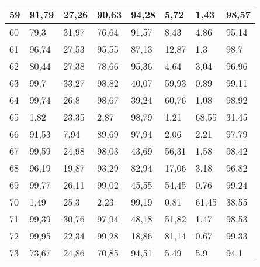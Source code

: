\begin{longtable}[c]{|l|l|l|l|l|l|l|l|}
59              & 91,79        & 27,26        & 90,63       & 94,28         & 5,72          & 1,43          & 98,57         \\ \hline
60              & 79,3         & 31,97        & 76,64       & 91,57         & 8,43          & 4,86          & 95,14         \\ \hline
61              & 96,74        & 27,53        & 95,55       & 87,13         & 12,87         & 1,3           & 98,7          \\ \hline
62              & 80,44        & 27,38        & 78,66       & 95,36         & 4,64          & 3,04          & 96,96         \\ \hline
63              & 99,7         & 33,27        & 98,82       & 40,07         & 59,93         & 0,89          & 99,11         \\ \hline
64              & 99,74        & 26,8         & 98,67       & 39,24         & 60,76         & 1,08          & 98,92         \\ \hline
65              & 1,82         & 23,35        & 2,87        & 98,79         & 1,21          & 68,55         & 31,45         \\ \hline
66              & 91,53        & 7,94         & 89,69       & 97,94         & 2,06          & 2,21          & 97,79         \\ \hline
67              & 99,59        & 24,98        & 98,03       & 43,69         & 56,31         & 1,58          & 98,42         \\ \hline
68              & 96,19        & 19,87        & 93,29       & 82,94         & 17,06         & 3,18          & 96,82         \\ \hline
69              & 99,77        & 26,11        & 99,02       & 45,55         & 54,45         & 0,76          & 99,24         \\ \hline
70              & 1,49         & 25,3         & 2,23        & 99,19         & 0,81          & 61,45         & 38,55         \\ \hline
71              & 99,39        & 30,76        & 97,94       & 48,18         & 51,82         & 1,47          & 98,53         \\ \hline
72              & 99,95        & 22,34        & 99,28       & 18,86         & 81,14         & 0,67          & 99,33         \\ \hline
73              & 73,67        & 24,86        & 70,85       & 94,51         & 5,49          & 5,9           & 94,1          \\ \hline

\end{longtable}
